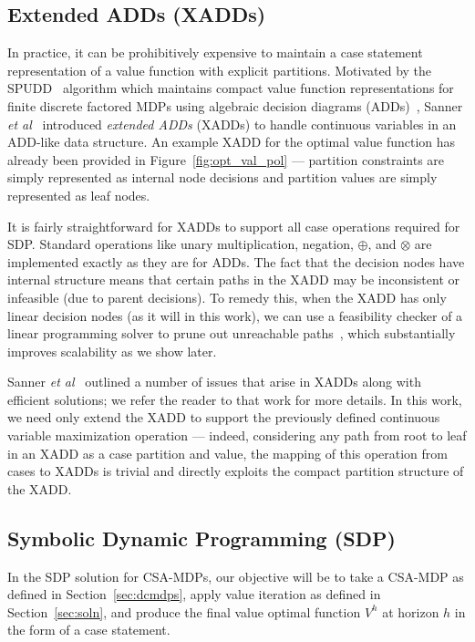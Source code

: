\subsection{Extended ADDs (XADDs)}

In practice, it can be prohibitively expensive to maintain a case
statement representation of a value function with explicit partitions.
Motivated by the SPUDD~\cite{spudd} algorithm which maintains compact
value function representations for finite discrete factored MDPs using
algebraic decision diagrams (ADDs)~\cite{bahar93add}, Sanner {\it et
al}~\cite{sanner_uai11} introduced \emph{extended ADDs} (XADDs) to handle
continuous variables in an ADD-like data structure.  An
example XADD for the optimal \MarsRover value function has already
been provided in Figure~\ref{fig:opt_val_pol} --- partition
constraints are simply represented as internal node decisions and
partition values are simply represented as leaf nodes.

It is fairly straightforward for XADDs to support all case operations
required for SDP.  Standard operations like unary multiplication,
negation, $\oplus$, and $\otimes$ are implemented exactly as they are
for ADDs.  The fact that the decision nodes have internal structure
means that certain paths in the XADD may be inconsistent or infeasible
(due to parent decisions).  To remedy this, when the XADD has only
linear decision nodes (as it will in this work), we can use a 
feasibility checker of a linear programming solver
to prune out unreachable paths~\cite{sanner_uai}, which substantially
improves scalability as we show later.

Sanner {\it et al}~\cite{sanner_uai11} outlined a number of issues
that arise in XADDs along with efficient solutions; we refer the
reader to that work for more details.  In this work, we need only
extend the XADD to support the previously defined continuous variable
maximization operation --- indeed, considering any path from root to
leaf in an XADD as a case partition and value, the mapping of this
operation from cases to XADDs is trivial and directly exploits
the compact partition structure of the XADD.

\subsection{Symbolic Dynamic Programming (SDP)}

In the SDP solution for CSA-MDPs, our objective will be to take
a CSA-MDP as defined in Section~\ref{sec:dcmdps}, apply value
iteration as defined in Section~\ref{sec:soln}, and produce
the final value optimal function $V^h$ at horizon $h$ in the form
of a case statement.

